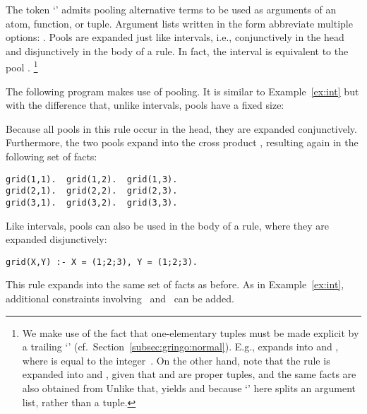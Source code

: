 The token `\code{;}' admits pooling alternative terms
to be used as arguments of an atom, function, or tuple.
Argument lists written in the form  abbreviate multiple options:
.
Pools are expanded just like intervals, i.e.,
conjunctively in the head and disjunctively in the body of a rule.
In fact, the interval  is equivalent to the pool .%
\footnote{%
We make use of the fact that one-elementary tuples
must be made explicit by a trailing `\code{,}' (cf.\ Section~\ref{subsec:gringo:normal}).
E.g.,  expands into  and ,
where  is equal to the integer~.
On the other hand, note that the rule
is expanded into 
 and ,
given that  and  are proper tuples,
and the same facts are also obtained from
Unlike that,  yields
 and 
because `\code{;}' here splits an argument list,
rather than a tuple.}
\begin{example}\label{ex:pool}
The following program makes use of pooling.
It is similar to Example~\ref{ex:int}
but with the difference that, unlike intervals, pools have a fixed size:%

%
Because all pools in this rule occur in the head,
they are expanded conjunctively.
Furthermore, the two pools expand into the cross product ,
resulting again in the following set of facts:
\begin{lstlisting}[numbers=none]
grid(1,1).  grid(1,2).  grid(1,3).
grid(2,1).  grid(2,2).  grid(2,3).
grid(3,1).  grid(3,2).  grid(3,3).
\end{lstlisting}
Like intervals, pools can also be used in the body of a rule,
where they are expanded disjunctively:
\begin{lstlisting}
grid(X,Y) :- X = (1;2;3), Y = (1;2;3).
\end{lstlisting}
This rule expands into the same set of facts as before.
As in Example~\ref{ex:int}, additional constraints involving~ and~ can be added.
\end{example}

